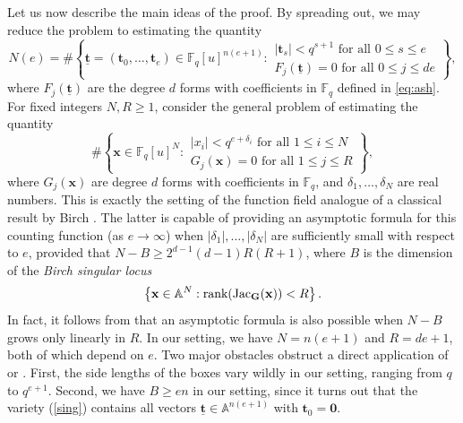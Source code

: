 \documentclass[12pt, reqno]{amsart}
\numberwithin{equation}{section}
\newcommand{\0}{\mathbf{0}}
\renewcommand{\AA}{\mathbb{A}}
\newcommand{\FF}{\mathbb{F}}
\renewcommand{\leq}{\leqslant}
\renewcommand{\geq}{\geqslant}
\newcommand{\x}{\mathbf{x}}
\renewcommand{\=}{\equiv}
\renewcommand{\t}{\mathbf{t}}
\newcommand{\1}{\mathbf{1}}
\theoremstyle{definition}
\begin{document}
\medskip

Let us now describe the main ideas of the proof. By spreading out,
we may reduce the problem to estimating the quantity
\begin{equation}
\label{big*}
N(e) = \#\left\{
 \underline{ \mathbf{t} } = (\t_0, \dots, \t_e) \in \FF_q[u]^{n (e + 1) } :
\begin{array}{l}
|\t_s|  < q^{s + 1} \text{ for all $0 \leq s \leq e$}  \\
F_j(  \underline{ \t }  ) = 0 \text{ for all $0 \leq j \leq d e$}
\end{array}
\right\},
\end{equation}
where $F_j(  \underline{ \t }  )$ are the degree $d$ forms with coefficients in $\FF_q$ defined in \eqref{eq:ash}. 
For fixed integers $N,R\geq 1$, 
consider the general problem of 
estimating the quantity
$$
\#\left\{
 \x \in \FF_q[u]^{ N } :
\begin{array}{l}
|x_i|  < q^{e + \delta_i} \text{ for all $1 \leq i \leq N$}  \\
G_j(  \x  ) = 0 \text{ for all $1 \leq j \leq R$}
\end{array}
\right\},
$$
where $G_j(\x)$ are degree $d$ forms  with coefficients in $\FF_q$,  and  $\delta_1,\dots,\delta_N$
are real numbers.
This is exactly the setting of the function field analogue \cite{lee} 
of a classical result by  Birch \cite{B}. The latter is capable of providing an asymptotic formula for this counting function (as $e\to \infty$) when 
$|\delta_1|,\dots,|\delta_N|$ are sufficiently small with respect to $e$,
provided that $N-B\geq 2^{d-1}(d-1)R(R+1)$, where $B$ is the dimension of the {\em Birch singular locus}
\begin{equation}
\label{sing}
\left\{ \x \in \AA^N: \textnormal{rank} (  \textnormal{Jac}_\mathbf{G} (\x)  ) < R  \right\}.
\end{equation}
In fact, it follows from  \cite{BVY} that an asymptotic formula is also possible when $N-B$ grows only linearly in $R$.
In our setting, we have $N=n(e+1)$ and $R=de+1$, both of which depend on $e$. 
Two major obstacles  obstruct a direct  application of \cite{lee} or \cite{BVY}. First,  the side lengths of the boxes vary wildly in our setting, ranging from $q$ to $q^{e+1}$. Second, we have $B\geq en$
in our setting, 
since it turns out that
the variety  (\ref{sing}) contains all vectors
$\underline{ \mathbf{t} } \in \AA^{n (e + 1) }$ with  $\t_0 = \0$.
\end{document}
